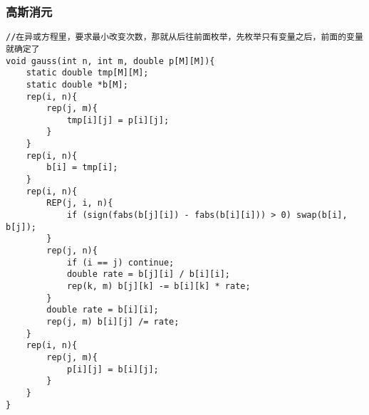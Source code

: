 \subsubsection{高斯消元}
\begin{verbatim}
//在异或方程里，要求最小改变次数，那就从后往前面枚举，先枚举只有变量之后，前面的变量就确定了
void gauss(int n, int m, double p[M][M]){
	static double tmp[M][M];
    static double *b[M];
	rep(i, n){
		rep(j, m){
			tmp[i][j] = p[i][j];
		}
	}
	rep(i, n){
		b[i] = tmp[i];
	}
    rep(i, n){
        REP(j, i, n){
            if (sign(fabs(b[j][i]) - fabs(b[i][i])) > 0) swap(b[i], b[j]);
        }
        rep(j, n){
            if (i == j) continue;
            double rate = b[j][i] / b[i][i];
            rep(k, m) b[j][k] -= b[i][k] * rate;
        }
        double rate = b[i][i];
        rep(j, m) b[i][j] /= rate;
    }
	rep(i, n){
		rep(j, m){
			p[i][j] = b[i][j];
		}
	}
}
\end{verbatim}
